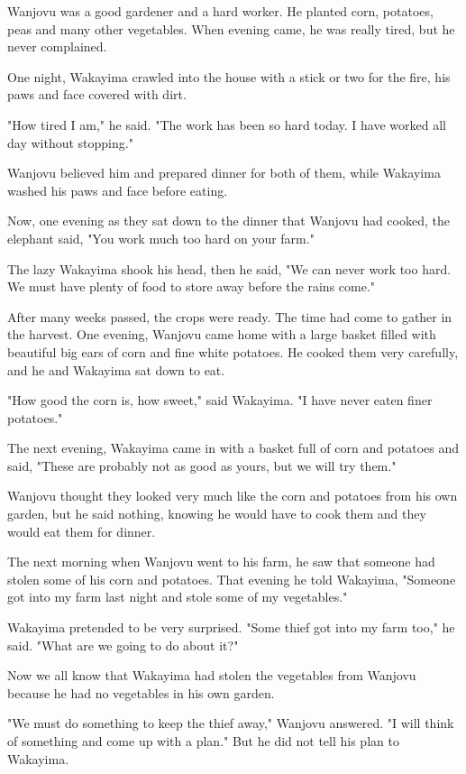 Wanjovu was a good gardener and a hard worker. He planted corn, potatoes, peas and many other vegetables. When evening came, he was really tired, but he never complained.

One night, Wakayima crawled into the house with a stick or two for the fire, his paws and face covered with dirt.

"How tired I am," he said. "The work has been so hard today. I have worked all day without stopping."

Wanjovu believed him and prepared dinner for both of them, while Wakayima washed his paws and face before eating.

Now, one evening as they sat down to the dinner that Wanjovu had cooked, the elephant said, "You work much too hard on your farm."

The lazy Wakayima shook his head, then he said, "We can never work too hard. We must have plenty of food to store away before the rains come."

After many weeks passed, the crops were ready. The time had come to gather in the harvest. One evening, Wanjovu came home with a large basket filled with beautiful big ears of corn and fine white potatoes. He cooked them very carefully, and he and Wakayima sat down to eat.

"How good the corn is, how sweet," said Wakayima. "I have never eaten finer potatoes."

The next evening, Wakayima came in with a basket full of corn and potatoes and said, "These are probably not as good as yours, but we will try them."

Wanjovu thought they looked very much like the corn and potatoes from his own garden, but he said nothing, knowing he would have to cook them and they would eat them for dinner.

The next morning when Wanjovu went to his farm, he saw that someone had stolen some of his corn and potatoes. That evening he told Wakayima, "Someone got into my farm last night and stole some of my vegetables."

Wakayima pretended to be very surprised. "Some thief got into my farm too," he said. "What are we going to do about it?"

Now we all know that Wakayima had stolen the vegetables from Wanjovu because he had no vegetables in his own garden.

"We must do something to keep the thief away," Wanjovu answered. "I will think of something and come up with a plan." But he did not tell his plan to Wakayima.

